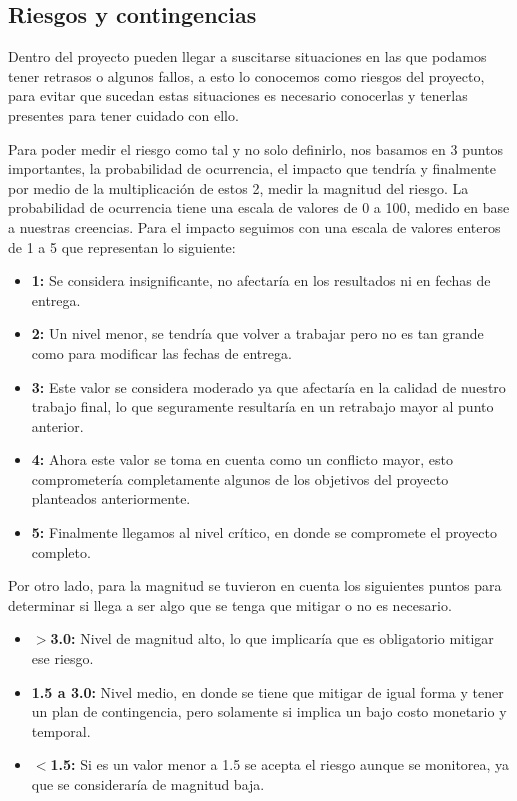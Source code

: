 \subsection{Riesgos y contingencias}

Dentro del proyecto pueden llegar a suscitarse situaciones en las que podamos tener retrasos o algunos fallos, a esto lo conocemos como riesgos del proyecto, para evitar que sucedan estas situaciones es necesario conocerlas y tenerlas presentes para tener cuidado con ello.

Para poder medir el riesgo como tal y no solo definirlo, nos basamos en 3 puntos importantes, la probabilidad de ocurrencia, el impacto que tendría y finalmente por medio de la multiplicación de estos 2, medir la magnitud del riesgo. La probabilidad de ocurrencia tiene una escala de valores de 0 a 100, medido en base a nuestras creencias. Para el impacto seguimos con una escala de valores enteros de 1 a 5 que representan lo siguiente:

\begin{itemize}
  \item \textbf{1:} Se considera insignificante, no afectaría en los resultados ni en fechas de entrega.
  \item \textbf{2:} Un nivel menor, se tendría que volver a trabajar pero no es tan grande como para modificar las fechas de entrega.
  \item \textbf{3:} Este valor se considera moderado ya que afectaría en la calidad de nuestro trabajo final, lo que seguramente resultaría en un retrabajo mayor al punto anterior.
  \item \textbf{4:} Ahora este valor se toma en cuenta como un conflicto mayor, esto comprometería completamente algunos de los objetivos del proyecto planteados anteriormente.
  \item \textbf{5:} Finalmente llegamos al nivel crítico, en donde se compromete el proyecto completo.
\end{itemize}

Por otro lado, para la magnitud se tuvieron en cuenta los siguientes puntos para determinar si llega a ser algo que se tenga que mitigar o no es necesario.

\begin{itemize}
  \item \textbf{$>$3.0:} Nivel de magnitud alto, lo que implicaría que es obligatorio mitigar ese riesgo.
  \item \textbf{1.5 a 3.0:} Nivel medio, en donde se tiene que mitigar de igual forma y tener un plan de contingencia, pero solamente si implica un bajo costo monetario y temporal.
  \item \textbf{$<$1.5:} Si es un valor menor a 1.5 se acepta el riesgo aunque se monitorea, ya que se consideraría de magnitud baja.
\end{itemize}

